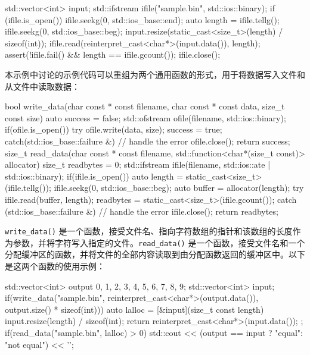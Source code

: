 \begin{cpp}
std::vector<int> input;
std::ifstream ifile("sample.bin", std::ios::binary);
if (ifile.is_open())
{
    ifile.seekg(0, std::ios_base::end);
    auto length = ifile.tellg();
    ifile.seekg(0, std::ios_base::beg);
    input.resize(static_cast<size_t>(length) / sizeof(int));
    ifile.read(reinterpret_cast<char*>(input.data()), length);
    assert(!ifile.fail() && length == ifile.gcount());
    ifile.close();
}
\end{cpp}

本示例中讨论的示例代码可以重组为两个通用函数的形式，用于将数据写入文件和从文件中读取数据：

\begin{cpp}
bool write_data(char const * const filename,
    char const * const data,
    size_t const size)
{
    auto success = false;
    std::ofstream ofile(filename, std::ios::binary);
    if(ofile.is_open())
    {
        try
        {
            ofile.write(data, size);
            success = true;
        }
        catch(std::ios_base::failure &)
        {
            // handle the error
        }
        ofile.close();
    }
    return success;
}
size_t read_data(char const * const filename,
std::function<char*(size_t const)> allocator)
{
    size_t readbytes = 0;
    std::ifstream ifile(filename, std::ios::ate | std::ios::binary);
    if(ifile.is_open())
    {
        auto length = static_cast<size_t>(ifile.tellg());
        ifile.seekg(0, std::ios_base::beg);
        auto buffer = allocator(length);
        try
        {
            ifile.read(buffer, length);
            readbytes = static_cast<size_t>(ifile.gcount());
        }
        catch (std::ios_base::failure &)
        {
            // handle the error
        }
        ifile.close();
    }
    return readbytes;
}
\end{cpp}

\verb|write_data()| 是一个函数，接受文件名、指向字符数组的指针和该数组的长度作为参数，并将字符写入指定的文件。\verb|read_data()| 是一个函数，接受文件名和一个分配缓冲区的函数，并将文件的全部内容读取到由分配函数返回的缓冲区中。以下是这两个函数的使用示例：

\begin{cpp}
std::vector<int> output {0, 1, 2, 3, 4, 5, 6, 7, 8, 9};
std::vector<int> input;
if(write_data("sample.bin",
               reinterpret_cast<char*>(output.data()),
               output.size() * sizeof(int)))
{
    auto lalloc = [&input](size_t const length)
    {
        input.resize(length) / sizeof(int);
        return reinterpret_cast<char*>(input.data());
    };
    if(read_data("sample.bin", lalloc) > 0)
    {
        std::cout << (output == input ? "equal": "not equal")
        << '\n';
    }
}
\end{cpp}

